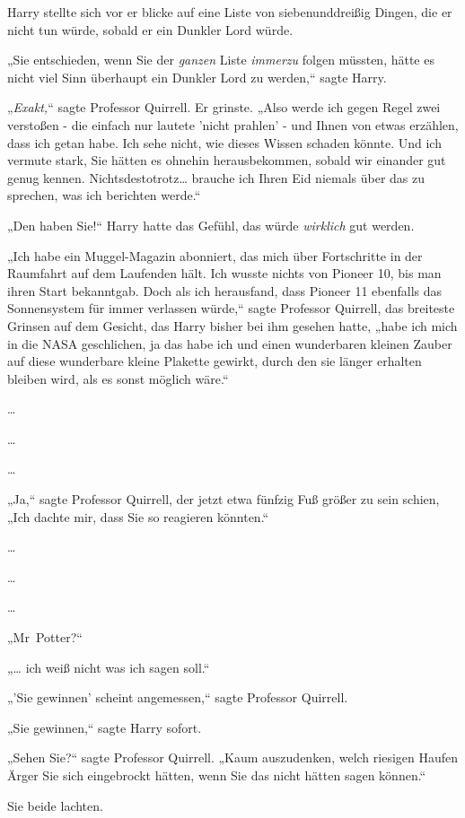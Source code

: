 {Harry stellte sich vor er blicke auf eine Liste von siebenunddreißig Dingen, die er nicht tun würde, sobald er ein Dunkler Lord würde.

„Sie entschieden, wenn Sie der \emph{ganzen} Liste \emph{immerzu} folgen müssten, hätte es nicht viel Sinn überhaupt ein Dunkler Lord zu werden,“ sagte Harry.

„\emph{Exakt,}“ sagte Professor Quirrell. Er grinste. „Also werde ich gegen Regel zwei verstoßen - die einfach nur lautete 'nicht prahlen' - und Ihnen von etwas erzählen, dass ich getan habe. Ich sehe nicht, wie dieses Wissen schaden könnte. Und ich vermute stark, Sie hätten es ohnehin herausbekommen, sobald wir einander gut genug kennen. Nichtsdestotrotz… brauche ich Ihren Eid niemals über das zu sprechen, was ich berichten werde.“

„Den haben Sie!“ Harry hatte das Gefühl, das würde \emph{wirklich} gut werden.

„Ich habe ein Muggel-Magazin abonniert, das mich über Fortschritte in der Raumfahrt auf dem Laufenden hält. Ich wusste nichts von Pioneer 10, bis man ihren Start bekanntgab. Doch als ich herausfand, dass Pioneer 11 ebenfalls das Sonnensystem für immer verlassen würde,“ sagte Professor Quirrell, das breiteste Grinsen auf dem Gesicht, das Harry bisher bei ihm gesehen hatte, „habe ich mich in die NASA geschlichen, ja das habe ich und einen wunderbaren kleinen Zauber auf diese wunderbare kleine Plakette gewirkt, durch den sie länger erhalten bleiben wird, als es sonst möglich wäre.“

…

…

…

„Ja,“ sagte Professor Quirrell, der jetzt etwa fünfzig Fuß größer zu sein schien, „Ich dachte mir, dass Sie so reagieren könnten.“

…

…

…

„Mr~Potter?“

„… ich weiß nicht was ich sagen soll.“

„'Sie gewinnen' scheint angemessen,“ sagte Professor Quirrell.

„Sie gewinnen,“ sagte Harry sofort.

„Sehen Sie?“ sagte Professor Quirrell. „Kaum auszudenken, welch riesigen Haufen Ärger Sie sich eingebrockt hätten, wenn Sie das nicht hätten sagen können.“

Sie beide lachten.

}

